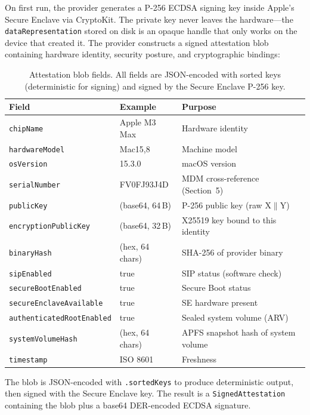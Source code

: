 \documentclass[10pt,twocolumn,letterpaper]{article}
\begin{document}
On first run, the provider generates a P-256 ECDSA signing key inside Apple's Secure Enclave via CryptoKit. The private key never leaves the hardware---the \texttt{dataRepresentation} stored on disk is an opaque handle that only works on the device that created it. The provider constructs a signed attestation blob containing hardware identity, security posture, and cryptographic bindings:

\begin{table}[h]
\centering
\caption{Attestation blob fields. All fields are JSON-encoded with sorted keys (deterministic for signing) and signed by the Secure Enclave P-256 key.}
\vspace{4pt}
\scriptsize
\begin{tabular}{@{}llp{3.2cm}@{}}
\toprule
\textbf{Field} & \textbf{Example} & \textbf{Purpose} \\
\midrule
\texttt{chipName} & Apple M3 Max & Hardware identity \\
\texttt{hardwareModel} & Mac15,8 & Machine model \\
\texttt{osVersion} & 15.3.0 & macOS version \\
\texttt{serialNumber} & FV0FJ93J4D & MDM cross-reference (Section~5) \\
\texttt{publicKey} & (base64, 64\,B) & P-256 public key (raw X$\|$Y) \\
\texttt{encryptionPublicKey} & (base64, 32\,B) & X25519 key bound to this identity \\
\texttt{binaryHash} & (hex, 64 chars) & SHA-256 of provider binary \\
\texttt{sipEnabled} & true & SIP status (software check) \\
\texttt{secureBootEnabled} & true & Secure Boot status \\
\texttt{secureEnclaveAvailable} & true & SE hardware present \\
\texttt{authenticatedRootEnabled} & true & Sealed system volume (ARV) \\
\texttt{systemVolumeHash} & (hex, 64 chars) & APFS snapshot hash of system volume \\
\texttt{timestamp} & ISO 8601 & Freshness \\
\bottomrule
\end{tabular}
\end{table}

The blob is JSON-encoded with \texttt{.sortedKeys} to produce deterministic output, then signed with the Secure Enclave key. The result is a \texttt{SignedAttestation} containing the blob plus a base64 DER-encoded ECDSA signature.
\end{document}
